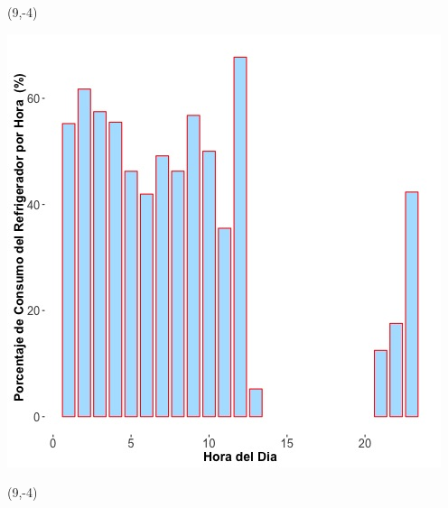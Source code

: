 \documentclass{article}\usepackage[]{graphicx}\usepackage[]{color}
\newenvironment{knitrout}{}{} %
\begin{document}
 \begin{textblock}{1}(9,-4)
\begin{minipage}{20em}
\begingroup

\endgroup
\end{minipage}
\end{textblock}

 \vspace{2cm}

\begin{knitrout}
\color{fgcolor}
\includegraphics[scale=0.65]{figure/A17_fridge_energy_pct.jpg} 
\end{knitrout}

 \begin{textblock}{1}(9,-4)
\begin{minipage}{20em}
\begingroup

\endgroup
\end{minipage}
\end{textblock}
\end{document}
